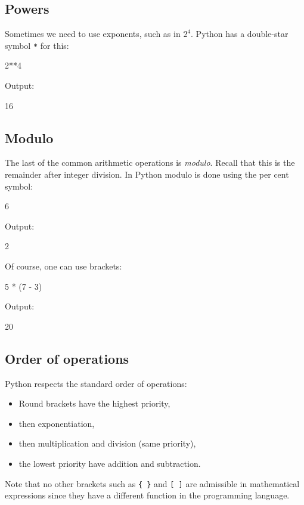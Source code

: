 \subsection{Powers}
Sometimes we need to use exponents, such as in $2^4$. Python has a double-star
symbol {\tt **} for this:

\begin{bluecode}
2**4
\end{bluecode}
Output:

\begin{greencode}
16
\end{greencode}
\subsection{Modulo}
The last of the common arithmetic operations is {\em modulo}. Recall that this is the remainder 
after integer division. In Python modulo is done using the per cent symbol:

\begin{bluecode}
6 %
\end{bluecode}
Output:

\begin{greencode}
2
\end{greencode}
Of course, one can use brackets:

\begin{bluecode}
5 * (7 - 3)
\end{bluecode}
Output:

\begin{greencode}
20
\end{greencode}
\subsection{Order of operations}
Python respects the standard order of operations:

\begin{itemize} 
\item Round brackets have the highest priority,
\item then exponentiation, 
\item then multiplication and division (same priority),
\item the lowest priority have addition and subtraction.
\end{itemize}
Note that no other brackets such as {\tt \{ \}} and {\tt [ ]} are 
admissible in mathematical expressions since they have a different 
function in the programming language.

